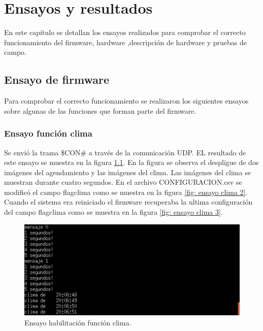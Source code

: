 
\chapter{Ensayos y resultados} %

\label{Chapter4} %


En este capítulo se detallan los ensayos realizados para comprobar el correcto funcionamiento del firmware, hardware ,descripción de hardware y pruebas de campo.
\section{Ensayo de firmware}
Para comprobar el correcto funcionamiento se realizaron los siguientes ensayos sobre algunas de las funciones que forman parte del firmware.
\subsection{Ensayo función clima}
Se envió la trama \$CON\# a través de la comunicación UDP. EL resultado de este ensayo se muestra en la figura \ref{fig: ensayo clima 1}. En la figura se observa el despligue de dos imágenes del agendamiento y las imágenes del clima. Las imágenes del clima se muestran durante cuatro segundos. En el archivo CONFIGURACION.csv se modificó el campo flagclima como se muestra en la figura \ref{fig: ensayo clima 2}. Cuando el sistema era reiniciado el firmware recuperaba la ultima configuración del campo flagclima como se muestra en la figura \ref{fig: ensayo clima 3}. 

\begin{figure}[htpb]
	\centering
	\includegraphics[scale=0.8]{Figures/pruebaclima1.png} 
	\caption{Ensayo habilitación función clima.}
	\label{fig: ensayo clima 1}
\end{figure}

